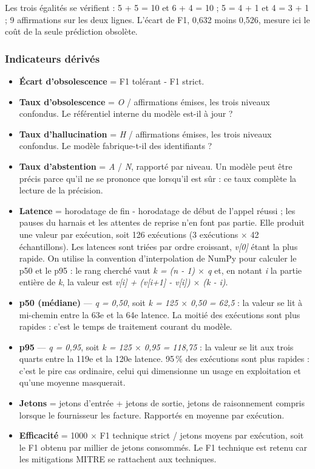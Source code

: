Les trois égalités se vérifient : 5 + 5 = 10 et 6 + 4 = 10 ; 5 = 4 + 1 et 4 = 3 + 1 ; 9 affirmations sur les deux lignes. L'écart de F1, 0,632 moins 0,526, mesure ici le coût de la seule prédiction obsolète.

\subsubsection{Indicateurs dérivés}\label{sec:3-5}
\begin{itemize}
\item
  \textbf{Écart d'obsolescence} = F1 tolérant - F1 strict.
\item
  \textbf{Taux d'obsolescence} = \emph{O} / affirmations émises, les trois niveaux confondus. Le référentiel interne du modèle est-il à jour ?
\item
  \textbf{Taux d'hallucination} = \emph{H} / affirmations émises, les trois niveaux confondus. Le modèle fabrique-t-il des identifiants ?
\item
  \textbf{Taux d'abstention} = \emph{A} / \emph{N}, rapporté par niveau. Un modèle peut être précis parce qu'il ne se prononce que lorsqu'il est sûr : ce taux complète la lecture de la précision.
\item
  \textbf{Latence} = horodatage de fin - horodatage de début de l'appel réussi ; les pauses du harnais et les attentes de reprise n'en font pas partie. Elle produit une valeur par exécution, soit 126 exécutions (3 exécutions $\times$ 42 échantillons). Les latences sont triées par ordre croissant, \emph{v{[}0{]}} étant la plus rapide. On utilise la convention d'interpolation de NumPy pour calculer le p50 et le p95 : le rang cherché vaut \emph{k = (n - 1) $\times$ q} et, en notant \emph{i} la partie entière de \emph{k}, la valeur est \emph{v{[}i{]} + (v{[}i+1{]} - v{[}i{]}) $\times$ (k - i)}.
\item
  \textbf{p50 (médiane)} --- \emph{q = 0,50}, soit \emph{k = 125 $\times$ 0,50 = 62,5} : la valeur se lit à mi-chemin entre la 63e et la 64e latence. La moitié des exécutions sont plus rapides : c'est le temps de traitement courant du modèle.
\item
  \textbf{p95} --- \emph{q = 0,95}, soit \emph{k = 125 $\times$ 0,95 = 118,75} : la valeur se lit aux trois quarts entre la 119e et la 120e latence. 95\,\% des exécutions sont plus rapides : c'est le pire cas ordinaire, celui qui dimensionne un usage en exploitation et qu'une moyenne masquerait.
\item
  \textbf{Jetons} = jetons d'entrée + jetons de sortie, jetons de raisonnement compris lorsque le fournisseur les facture. Rapportés en moyenne par exécution.
\item
  \textbf{Efficacité} = 1000 $\times$ F1 technique strict / jetons moyens par exécution, soit le F1 obtenu par millier de jetons consommés. Le F1 technique est retenu car les mitigations MITRE se rattachent aux techniques.
\end{itemize}

